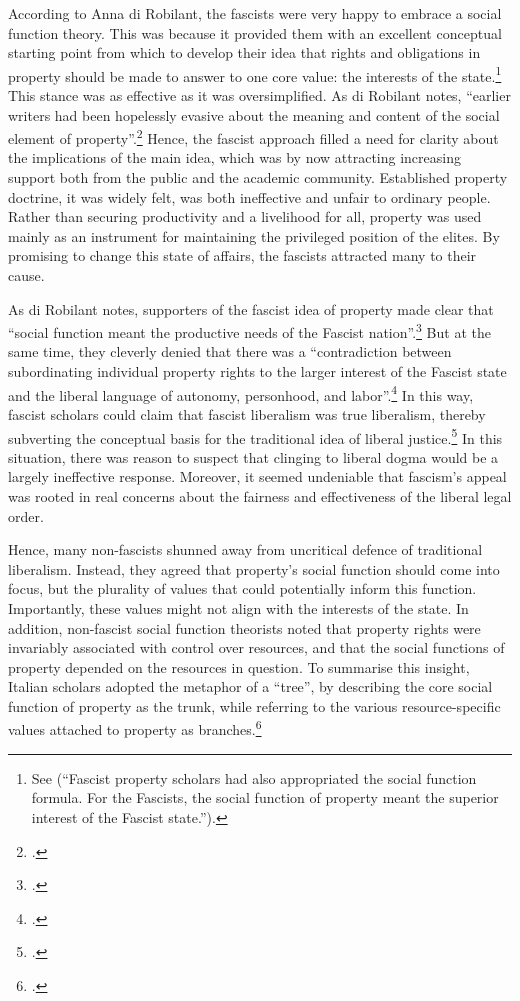 {According to Anna di Robilant, the fascists were very happy to embrace a social function theory. This was because it provided them with an excellent conceptual starting point from which to develop their idea that rights and obligations in property should be made to answer to one core value: the interests of the state.\footnote{See \cite[908-909]{robilant13} (``Fascist property scholars had also appropriated the social function formula. For the Fascists, the social function of property meant the superior interest of the Fascist state.'').} This stance was as effective as it was oversimplified. As di Robilant notes, ``earlier writers had been hopelessly evasive about the meaning and content of the social element of property''.\footcite[909]{robilant13} Hence, the fascist approach filled a need for clarity about the implications of the main idea, which was by now attracting increasing support both from the public and the academic community. Established property doctrine, it was widely felt, was both ineffective and unfair to ordinary people. Rather than securing productivity and a livelihood for all, property was used mainly as an instrument for maintaining the privileged position of the elites. By promising to change this state of affairs, the fascists attracted many to their cause.

As di Robilant notes, supporters of the fascist idea of property made clear that ``social function meant the productive needs of the Fascist nation''.\footcite[909]{robilant13} But at the same time, they cleverly denied that there was a ``contradiction between subordinating individual property rights to the larger interest of the Fascist state and the liberal language of autonomy, personhood, and labor''.\footcite[900]{robilant13} In this way, fascist scholars could claim that fascist liberalism was true liberalism, thereby subverting the conceptual basis for the traditional idea of liberal justice.\footcite[900]{robilant13} In this situation, there was reason to suspect that clinging to liberal dogma would be a largely ineffective response. Moreover, it seemed undeniable that fascism's appeal was rooted in real concerns about the fairness and effectiveness of the liberal legal order. 

Hence, many non-fascists shunned away from uncritical defence of traditional liberalism. Instead, they agreed that property's social function should come into focus, but  the plurality of values that could potentially inform this function. Importantly, these values might not align with the interests of the state. In addition, non-fascist social function theorists noted that property rights were invariably associated with control over resources, and that the social functions of property depended on the resources in question. 
To summarise this insight, Italian scholars adopted the metaphor of a ``tree'', by describing the core social function of property as the trunk, while referring to the various resource-specific values attached to property as branches.\footcite[894-916]{robilant13} %

}
